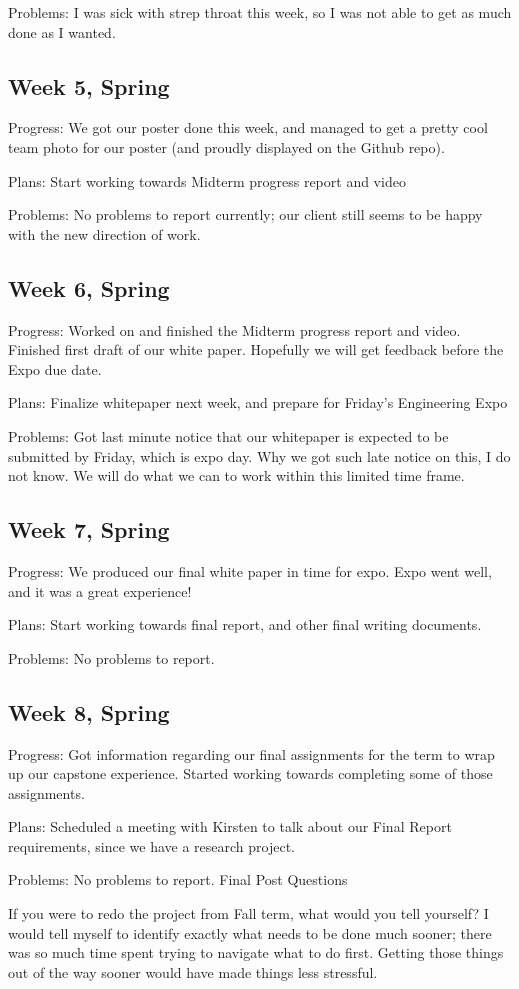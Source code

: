 \documentclass[IEEEtran,letterpaper,10pt,notitlepage,draftclsnofoot,onecolumn]{article}
\begin{document}
Problems: I was sick with strep throat this week, so I was not able to get as much done as I wanted.
\subsection{Week 5, Spring}
Progress: We got our poster done this week, and managed to get a pretty cool team photo for our poster (and proudly displayed on the Github repo).

Plans: Start working towards Midterm progress report and video

Problems: No problems to report currently; our client still seems to be happy with the new direction of work.
\subsection{Week 6, Spring}
Progress: Worked on and finished the Midterm progress report and video. Finished first draft of our white paper. Hopefully we will get feedback before the Expo due date.

Plans: Finalize whitepaper next week, and prepare for Friday's Engineering Expo

Problems: Got last minute notice that our whitepaper is expected to be submitted by Friday, which is expo day. Why we got such late notice on this, I do not know. We will do what we can to work within this limited time frame.
\subsection{Week 7, Spring}
Progress: We produced our final white paper in time for expo. Expo went well, and it was a great experience!

Plans: Start working towards final report, and other final writing documents.

Problems: No problems to report.
\subsection{Week 8, Spring}
Progress: Got information regarding our final assignments for the term to wrap up our capstone experience. Started working towards completing some of those assignments.

Plans: Scheduled a meeting with Kirsten to talk about our Final Report requirements, since we have a research project.

Problems: No problems to report.
Final Post Questions

If you were to redo the project from Fall term, what would you tell yourself? I would tell myself to identify exactly what needs to be done much sooner; there was so much time spent trying to navigate what to do first. Getting those things out of the way sooner would have made things less stressful.
\end{document}
